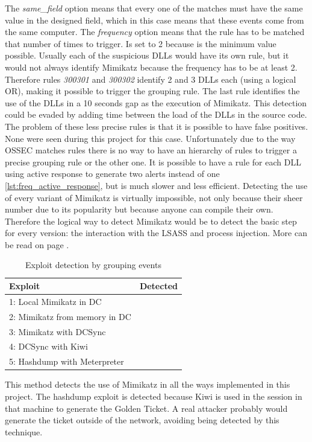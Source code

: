 \linej
The \textit{same\_field} option means that every one of the matches must have the same value in the designed field, which in this case means that these events come from the same computer.
\linej
The \textit{frequency} option means that the rule has to be matched that number of times to trigger. Is set to 2 because is the minimum value possible.
\linej
\linej
Usually each of the suspicious DLLs would have its own rule, but it would not always identify Mimikatz because the frequency has to be at least 2. Therefore rules \textit{300301} and \textit{300302} identify 2 and 3 DLLs each (using a logical OR), making it possible to trigger the grouping rule.
The last rule identifies the use of the DLLs in a 10 seconds gap as the execution of Mimikatz. This detection could be evaded by adding time between the load of the DLLs in the source code.
\linej
\linej
The problem of these less precise rules is that it is possible to have false positives. None were seen during this project for this case.
\linej
Unfortunately due to the way OSSEC matches rules there is no way to have an hierarchy of rules to trigger a precise grouping rule or the other one.
It is possible to have a rule for each DLL using active response to generate two alerts instead of one \ref{lst:freq_active_response}, but is much slower and less efficient.
\linej
\linej
Detecting the use of every variant of Mimikatz is virtually impossible, not only because their sheer number due to its popularity but because anyone can compile their own. Therefore the logical way to detect Mimikatz would be to detect the basic step for every version: the interaction with the LSASS and process injection. More can be read on page \pageref{detect_lsass}.

\begin{table}[H]
	\centering
	\begin{tabular}{|l|l|}
		\hline
		\rowcolor{gray!30}
		Exploit & Detected \\ \hline
		1: Local Mimikatz in DC& \RYES\\ \hline
		2: Mimikatz from memory in DC& \RYES\\ \hline
		3: Mimikatz with DCSync& \RYES\\ \hline
		4: DCSync with Kiwi& \RYES\\ \hline
		5: Hashdump with Meterpreter& \RYES\\ \hline
	\end{tabular}
	\caption{Exploit detection by grouping events}
\end{table}
This method detects the use of Mimikatz in all the ways implemented in this project.
The hashdump exploit is detected because Kiwi is used in the session in that machine to generate the Golden Ticket. A real attacker probably would generate the ticket outside of the network, avoiding being detected by this technique.

